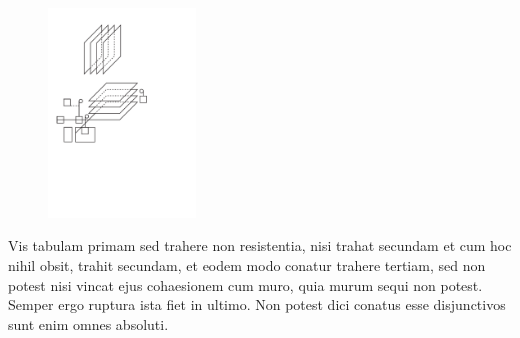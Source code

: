 \pend
\vspace*{1.5em}%
\pstart%
\noindent%
\begin{figure}
\vspace{-5mm}\includegraphics[trim = 0mm -3mm -5mm 0mm, clip, width=0.35\textwidth]{images/lh03705_208v-d9u10.pdf}\\
\end{figure}
Vis  tabulam primam sed trahere non
 resistentia, nisi trahat secundam et cum hoc nihil obsit, trahit secundam, et eodem modo conatur trahere tertiam, sed non potest nisi vincat ejus cohaesionem cum muro, quia murum sequi non potest. Semper ergo ruptura\protect{} ista fiet in ultimo.
Non potest dici conatus esse disjunctivos sunt enim omnes absoluti.
\newline

